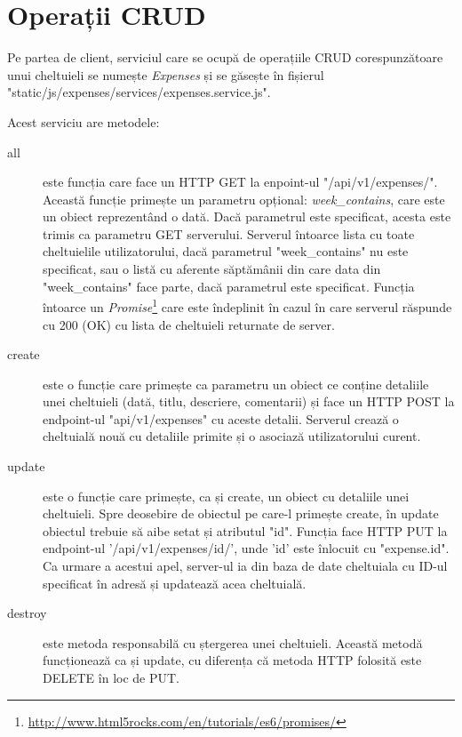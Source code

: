 \section{Operații CRUD}

Pe partea de client, serviciul care se ocupă de operațiile
CRUD corespunzătoare unui cheltuieli se numește \emph{Expenses}
și se găsește în fișierul "static/js/expenses/services/expenses.service.js".



Acest serviciu are metodele:
\begin{description}
\item [all] este funcția care face un HTTP GET la enpoint-ul
"/api/v1/expenses/". Această funcție primește un parametru
opțional: \emph{week\_contains}, care este un obiect reprezentând
o dată. Dacă parametrul este specificat, acesta este trimis
ca parametru GET serverului. Serverul întoarce lista cu toate
cheltuielile utilizatorului, dacă parametrul "week\_contains"
nu este specificat, sau o listă cu aferente săptămânii
din care data din "week\_contains" face parte, dacă parametrul
este specificat. Funcția întoarce un 
\emph{Promise}\footnote{\url{http://www.html5rocks.com/en/tutorials/es6/promises/}}
care este îndeplinit în cazul în care serverul răspunde cu 200 (OK)
cu lista de cheltuieli returnate de server.
\item [create] este o funcție care primește ca parametru
un obiect ce conține detaliile unei cheltuieli (dată,
titlu, descriere, comentarii) și face un HTTP POST
la endpoint-ul "api/v1/expenses" cu aceste detalii.
Serverul crează o cheltuială nouă cu detaliile primite
și o asociază utilizatorului curent.
\item [update] este o funcție care primește, ca și create,
un obiect cu detaliile unei cheltuieli. Spre deosebire de
obiectul pe care-l primește create, în update obiectul
trebuie să aibe setat și atributul "id". Funcția face
HTTP PUT la endpoint-ul '/api/v1/expenses/{id}/',
unde '{id}' este înlocuit cu "expense.id". Ca urmare
a acestui apel, server-ul ia din baza de date 
cheltuiala cu ID-ul specificat în adresă și updatează
acea cheltuială.
\item [destroy] este metoda responsabilă cu ștergerea
unei cheltuieli. Această metodă funcționează ca și update,
cu diferența că metoda HTTP folosită este DELETE în loc
de PUT.
\end{description}

